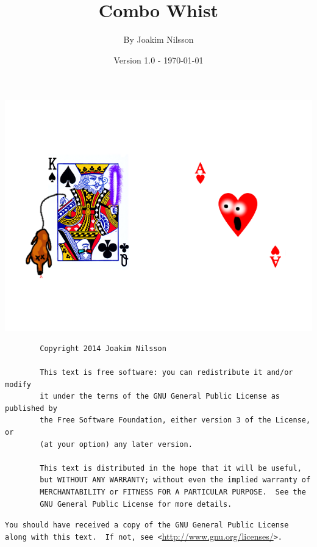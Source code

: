 \documentclass[a4paper]{article}
\title{Combo Whist}
\author{By Joakim Nilsson}
\date{Version 1.0 - \today}
\begin{document}
	\maketitle
	
	\begin{center}
		\includegraphics[width = \textwidth]{logo.png}
	\end{center}
	
	\vfill
	
	\begin{verbatim}
		Copyright 2014 Joakim Nilsson

		This text is free software: you can redistribute it and/or modify
		it under the terms of the GNU General Public License as published by
		the Free Software Foundation, either version 3 of the License, or
		(at your option) any later version.

		This text is distributed in the hope that it will be useful,
		but WITHOUT ANY WARRANTY; without even the implied warranty of
		MERCHANTABILITY or FITNESS FOR A PARTICULAR PURPOSE.  See the
		GNU General Public License for more details.
	\end{verbatim}
	\verb|You should have received a copy of the GNU General Public License|\\
	\verb|along with this text.  If not, see <|\url{http://www.gnu.org/licenses/}\verb|>.|
	
	\thispagestyle{empty}
	\pagebreak
	
	\setcounter{tocdepth}{3}
	\tableofcontents
	\listoftables
	\thispagestyle{empty}
	\pagebreak
	
\end{document}
